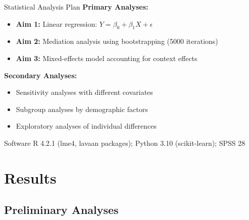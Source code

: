 \documentclass[aspectratio=169,11pt]{beamer}
\begin{document}
\begin{frame}{Statistical Analysis Plan}
  \textbf{Primary Analyses:}
  \begin{itemize}
    \item \textbf{Aim 1:} Linear regression: $Y = \beta_0 + \beta_1 X + \epsilon$
    \item \textbf{Aim 2:} Mediation analysis using bootstrapping (5000 iterations)
    \item \textbf{Aim 3:} Mixed-effects model accounting for context effects
  \end{itemize}
  
  \vspace{0.5cm}
  
  \textbf{Secondary Analyses:}
  \begin{itemize}
    \item Sensitivity analyses with different covariates
    \item Subgroup analyses by demographic factors
    \item Exploratory analyses of individual differences
  \end{itemize}
  
  \vspace{0.5cm}
  
  \begin{block}{Software}
    R 4.2.1 (lme4, lavaan packages); Python 3.10 (scikit-learn); SPSS 28
  \end{block}
\end{frame}


\section{Results}

\subsection{Preliminary Analyses}
\end{document}
